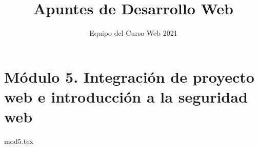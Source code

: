 \documentclass[12pt]{report}
\title{Apuntes de Desarrollo Web}
\author{Equipo del Curso Web 2021}
\begin{document}
	\maketitle
	\tableofcontents
	\lstlistoflistings
	\listoftables
	\lstset{style=table}
	
	\chapter{Módulo 5. Integración de proyecto web e introducción a la seguridad web}
		{mod5.tex}
\end{document}
